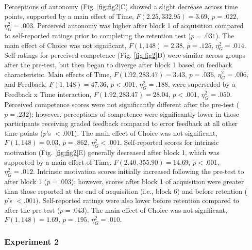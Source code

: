 \documentclass[
  doc, donotrepeattitle,floatsintext]{apa7}
\begin{document}
Perceptions of autonomy (Fig. \ref{fig:fig2}C) showed a slight decrease across time points, supported by a main effect of Time, \(F(2.25,332.95) = 3.69\), \(p = .022\), \(\eta_{G}^2 = .003\). Perceived autonomy was higher after block 1 of acquisition compared to self-reported ratings prior to completing the retention test (\(p = .031\)). The main effect of Choice was not significant, \(F(1,148) = 2.38\), \(p = .125\), \(\eta_{G}^2 = .014\). Self-ratings for perceived competence (Fig. \ref{fig:fig2}D) were similar across groups after the pre-test, but then began to diverge after block 1 based on feedback characteristic. Main effects of Time, \(F(1.92, 283.47) = 3.43\), \(p = .036\), \(\eta_{G}^2 = .006\), and Feedback, \(F(1,148) = 47.36\), \(p < .001\), \(\eta_{G}^2 = .188\), were superseded by a Feedback x Time interaction, \(F(1.92, 283.47) = 28.04\), \(p < .001\), \(\eta_{G}^2 = .050\). Perceived competence scores were not significantly different after the pre-test (\(p = .232\)); however, perceptions of competence were significantly lower in those participants receiving graded feedback compared to error feedback at all other time points (\(p\)'s \(< .001\)). The main effect of Choice was not significant, \(F(1,148) = 0.03\), \(p = .862\), \(\eta_{G}^2 < .001\). Self-reported scores for intrinsic motivation (Fig. \ref{fig:fig2}E) generally decreased after block 1, which was supported by a main effect of Time, \(F(2.40,355.90) = 14.69\), \(p < .001\), \(\eta_{G}^2 = .012\). Intrinsic motivation scores initially increased following the pre-test to after block 1 (\(p = .003\)); however, scores after block 1 of acquisition were greater than those reported at the end of acquisition (i.e., block 6) and before retention (\(p\)'s \(< .001\)). Self-reported ratings were also lower before retention compared to after the pre-test (\(p = .043\)). The main effect of Choice was not significant, \(F(1,148) = 1.69\), \(p = .195\), \(\eta_{G}^2 = .010\).

\hypertarget{experiment-2-4}{%
\subsubsection{Experiment 2}\label{experiment-2-4}}
\end{document}
